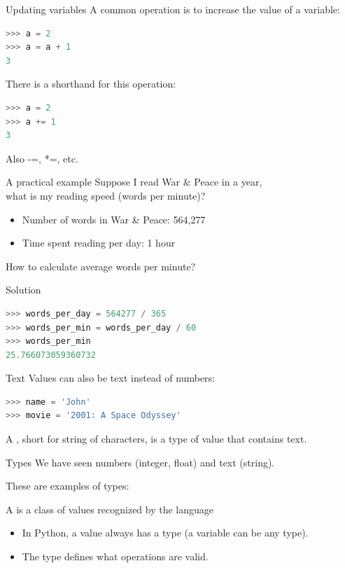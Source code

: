 \documentclass[aspectratio=169,usenames,dvipsnames]{beamer}
\begin{document}
\begin{frame}[fragile]{Updating variables}
A common operation is to increase the value of a variable:
\begin{lstlisting}[language=python]
>>> a = 2
>>> a = a + 1
3
\end{lstlisting}

\pause
There is a shorthand for this operation:
\begin{lstlisting}[language=python]
>>> a = 2
>>> a += 1
3
\end{lstlisting}

Also -=, *=, etc.
\end{frame}


\begin{frame}{A practical example}
    Suppose I read War \& Peace in a year, \\
    what is my reading speed (words per minute)?
    \begin{itemize}
        \item Number of words in War \& Peace: 564,277
        \item Time spent reading per day: 1 hour
    \end{itemize}
    How to calculate average words per minute?
\end{frame}

\begin{frame}[fragile]{Solution}
\begin{lstlisting}[language=python]
>>> words_per_day = 564277 / 365
>>> words_per_min = words_per_day / 60
>>> words_per_min
25.766073059360732
\end{lstlisting}
\end{frame}


\begin{frame}[fragile]{Text}
Values can also be text instead of numbers:
\begin{lstlisting}[language=python]
>>> name = 'John'
>>> movie = '2001: A Space Odyssey'
\end{lstlisting}

\pause
    \begin{definition}
        A , short for string of characters,
        is a type of value that contains text.
    \end{definition}
\end{frame}

\begin{frame}{Types}
    We have seen numbers (integer, float) and text (string).

    These are examples of types:

    \begin{definition}
        A  is a class of values recognized by the language
    \end{definition}
    
    \pause
    \begin{itemize}
        \item In Python, a value always has a type (a variable can be any type).
        \item The type defines what operations are valid.
    \end{itemize}
\end{frame}
\end{document}
